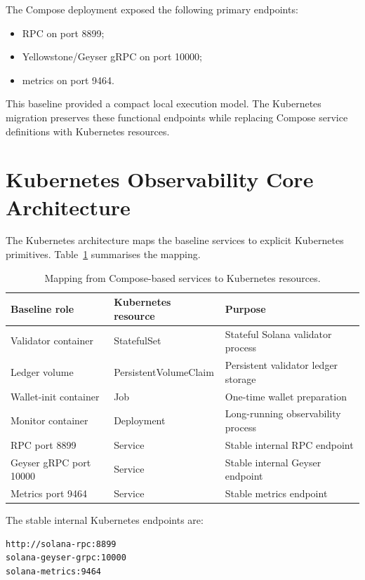 \documentclass[11pt,a4paper]{article}
\begin{document}
The Compose deployment exposed the following primary endpoints:

\begin{itemize}
  \item RPC on port 8899;
  \item Yellowstone/Geyser gRPC on port 10000;
  \item metrics on port 9464.
\end{itemize}

This baseline provided a compact local execution model. The Kubernetes migration preserves these functional endpoints while replacing Compose service definitions with Kubernetes resources.

\section{Kubernetes Observability Core Architecture}

The Kubernetes architecture maps the baseline services to explicit Kubernetes primitives. Table~\ref{tab:mapping} summarises the mapping.

\begin{table}[htbp]
\centering
\caption{Mapping from Compose-based services to Kubernetes resources.}
\label{tab:mapping}
\begin{tabular}{lll}
\toprule
\textbf{Baseline role} & \textbf{Kubernetes resource} & \textbf{Purpose} \\
\midrule
Validator container & StatefulSet & Stateful Solana validator process \\
Ledger volume & PersistentVolumeClaim & Persistent validator ledger storage \\
Wallet-init container & Job & One-time wallet preparation \\
Monitor container & Deployment & Long-running observability process \\
RPC port 8899 & Service & Stable internal RPC endpoint \\
Geyser gRPC port 10000 & Service & Stable internal Geyser endpoint \\
Metrics port 9464 & Service & Stable metrics endpoint \\
\bottomrule
\end{tabular}
\end{table}

The stable internal Kubernetes endpoints are:

\begin{lstlisting}[style=terminal]
http://solana-rpc:8899
solana-geyser-grpc:10000
solana-metrics:9464
\end{lstlisting}
\end{document}

